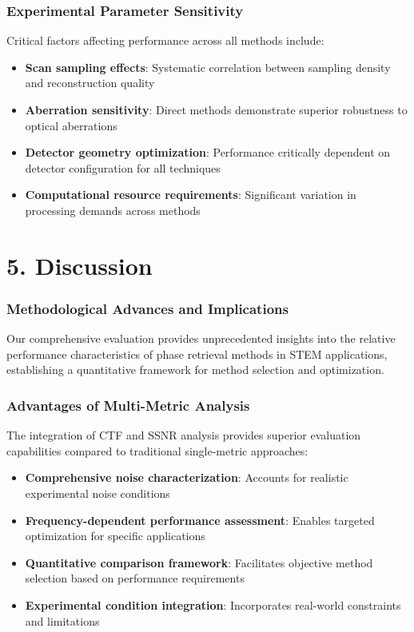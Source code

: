 \documentclass[
  letterpaper,
]{article}
\providecommand{\tightlist}{%
  \setlength{\itemsep}{0pt}\setlength{\parskip}{0pt}}
\begin{document}
\subsection{Experimental Parameter
Sensitivity}\label{experimental-parameter-sensitivity}

Critical factors affecting performance across all methods include:

\begin{itemize}
\tightlist
\item
  \textbf{Scan sampling effects}: Systematic correlation between
  sampling density and reconstruction quality
\item
  \textbf{Aberration sensitivity}: Direct methods demonstrate superior
  robustness to optical aberrations
\item
  \textbf{Detector geometry optimization}: Performance critically
  dependent on detector configuration for all techniques
\item
  \textbf{Computational resource requirements}: Significant variation in
  processing demands across methods
\end{itemize}


\chapter{5. Discussion}\label{discussion-1}

\subsection{Methodological Advances and
Implications}\label{methodological-advances-and-implications}

Our comprehensive evaluation provides unprecedented insights into the
relative performance characteristics of phase retrieval methods in STEM
applications, establishing a quantitative framework for method selection
and optimization.

\subsection{Advantages of Multi-Metric
Analysis}\label{advantages-of-multi-metric-analysis}

The integration of CTF and SSNR analysis provides superior evaluation
capabilities compared to traditional single-metric approaches:

\begin{itemize}
\tightlist
\item
  \textbf{Comprehensive noise characterization}: Accounts for realistic
  experimental noise conditions
\item
  \textbf{Frequency-dependent performance assessment}: Enables targeted
  optimization for specific applications\\
\item
  \textbf{Quantitative comparison framework}: Facilitates objective
  method selection based on performance requirements
\item
  \textbf{Experimental condition integration}: Incorporates real-world
  constraints and limitations
\end{itemize}
\end{document}
